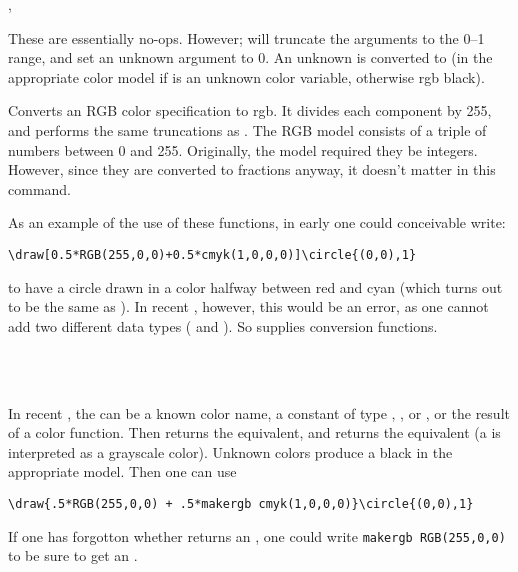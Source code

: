 \documentclass[letterpaper]{article}
\begin{document}
\begin{cd}
,
%
%
\end{cd}

These are essentially no-ops. However;  will truncate the
arguments to the 0--1 range, and set an unknown argument to 0. An
unknown  is converted to  (in the appropriate
color model if  is an unknown color variable, otherwise rgb
black).

\begin{cd}
%
\end{cd}

Converts an RGB color specification to rgb. It divides each component by
255, and performs the same truncations as . The RGB model
consists of a triple of numbers between 0 and 255. Originally, the model
required they be integers. However, since they are converted to
fractions anyway, it doesn't matter in this command.

\medskip
As an example of the use of these functions, in early \MP{} one could
conceivable write:
%
\begin{verbatim}
\draw[0.5*RGB(255,0,0)+0.5*cmyk(1,0,0,0)]\circle{(0,0),1}
\end{verbatim}
%
to have a circle drawn in a color halfway between red and cyan (which
turns out to be the same as ). In recent \MP{}, however,
this would be an error, as one cannot add two different data types
( and ). So \mfp{} supplies conversion functions.

\begin{cd}
\\
\\
%
%
%
\end{cd}

In recent \MP{}, the  can be a known color name, a constant
of type , , or , or the result of
a color function. Then  returns the 
equivalent, and  returns the  equivalent (a
  is interpreted as a grayscale color). Unknown
colors produce a black in the appropriate model. Then one can use
%
\begin{verbatim}
\draw{.5*RGB(255,0,0) + .5*makergb cmyk(1,0,0,0)}\circle{(0,0),1}
\end{verbatim}
%
If one has forgotton whether  returns an , one
could write \verb$makergb RGB(255,0,0)$ to be sure to get an
.
\end{document}
